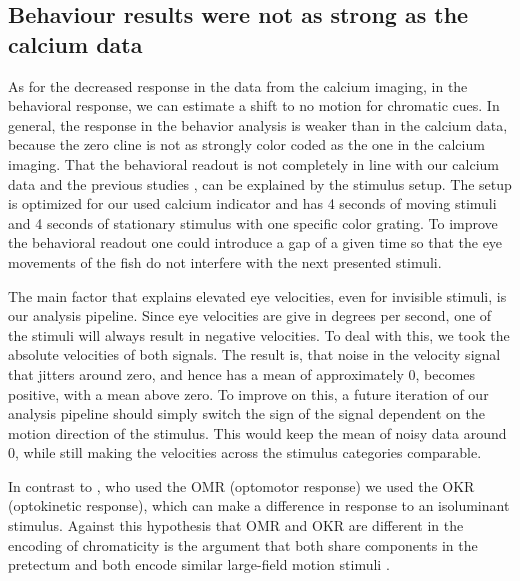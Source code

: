

\subsection{Behaviour results were not as strong as the calcium data}

As for the decreased response in the data from the calcium imaging, in the behavioral response, we can estimate a shift to no motion for chromatic cues. In general, the response in the behavior analysis is weaker than in the calcium data, because the zero cline is not as strongly color coded as the one in the calcium imaging. That the behavioral readout is not completely in line with our calcium data and the previous studies \parencite{orgerChannelingRedGreen2005}, can be explained by the stimulus setup. The setup is optimized for our used calcium indicator and has 4 seconds of moving stimuli and 4 seconds of stationary stimulus with one specific color grating. To improve the behavioral readout one could introduce a gap of a given time so that the eye movements of the fish do not interfere with the next presented stimuli. 

\vspace{\baselineskip}

The main factor that explains elevated eye velocities, even for invisible stimuli, is our analysis pipeline. Since eye velocities are give in degrees per second, one of the stimuli will always result in negative velocities. To deal with this, we took the absolute velocities of both signals. The result is, that noise in the velocity signal that jitters around zero, and hence has a mean of approximately 0, becomes positive, with a mean above zero. To improve on this, a future iteration of our analysis pipeline should simply switch the sign of the signal dependent on the motion direction of the stimulus. This would keep the mean of noisy data around 0, while still making the velocities across the stimulus categories comparable.

\vspace{\baselineskip}

In contrast to \cite{orgerChannelingRedGreen2005}, who used the OMR (optomotor response) we used the OKR (optokinetic response), which can make a difference in response to an isoluminant stimulus. Against this hypothesis that OMR and OKR are different in the encoding of chromaticity is the argument that both share components in the pretectum and both encode similar large-field motion stimuli \parencite{wang2019selective, bollmannZebrafishVisualSystem2019}.


